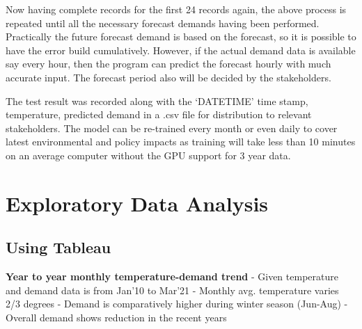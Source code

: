 \documentclass[mstat,12pt]{unswthesis}
\begin{document}
\bigskip

Now having complete records for the first 24 records again, the above
process is repeated until all the necessary forecast demands having been
performed. Practically the future forecast demand is based on the
forecast, so it is possible to have the error build cumulatively.
However, if the actual demand data is available say every hour, then the
program can predict the forecast hourly with much accurate input. The
forecast period also will be decided by the stakeholders.

\bigskip

The test result was recorded along with the `DATETIME' time stamp,
temperature, predicted demand in a .csv file for distribution to
relevant stakeholders. The model can be re-trained every month or even
daily to cover latest environmental and policy impacts as training will
take less than 10 minutes on an average computer without the GPU support
for 3 year data.

\hypertarget{exploratory-data-analysis}{%
\chapter{Exploratory Data Analysis}\label{exploratory-data-analysis}}

\hypertarget{using-tableau}{%
\section{Using Tableau}\label{using-tableau}}

\textbf{Year to year monthly temperature-demand trend} \newline \newline
- Given temperature and demand data is from Jan'10 to Mar'21 \newline -
Monthly avg. temperature varies 2/3 degrees \newline - Demand is
comparatively higher during winter season (Jun-Aug) \newline - Overall
demand shows reduction in the recent years \newline
\end{document}
